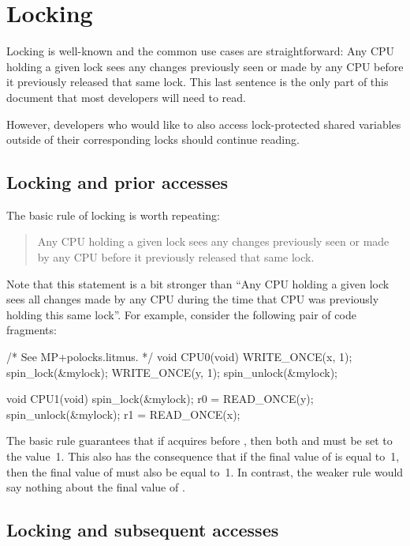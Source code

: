 \section{Locking}

Locking is well-known and the common use cases are straightforward:
Any CPU holding a given lock sees any changes previously seen or made by any
CPU before it previously released that same lock.
This last sentence is the only part of this document that most developers
will need to read.

However, developers who would like to also access lock-protected shared
variables outside of their corresponding locks should continue reading.


\subsection{Locking and prior accesses}

The basic rule of locking is worth repeating:

\begin{quote}
	Any CPU holding a given lock sees any changes previously seen
	or made by any CPU before it previously released that same lock.
\end{quote}

Note that this statement is a bit stronger than ``Any CPU holding a
given lock sees all changes made by any CPU during the time that CPU was
previously holding this same lock''.
For example, consider the following pair of code fragments:

\begin{VerbatimU}
	/* See MP+polocks.litmus. */
	void CPU0(void)
	{
		WRITE_ONCE(x, 1);
		spin_lock(&mylock);
		WRITE_ONCE(y, 1);
		spin_unlock(&mylock);
	}

	void CPU1(void)
	{
		spin_lock(&mylock);
		r0 = READ_ONCE(y);
		spin_unlock(&mylock);
		r1 = READ_ONCE(x);
	}
\end{VerbatimU}

The basic rule guarantees that if  acquires  before
, then both  and  must be set to the value~1.
This also has the consequence that if the final value of  is equal to~1,
then the final value of  must also be equal to~1.
In contrast, the weaker rule would say nothing about the final value of .


\subsection{Locking and subsequent accesses}

